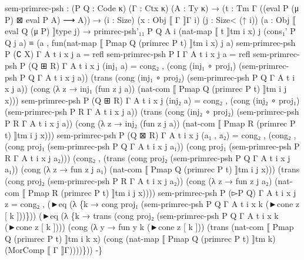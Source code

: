 \begin{code}
{sem{-}primrec{-}psh : (P Q : Code κ) (Γ : Ctx κ) (A : Ty κ)
  → (t : Tm Γ ((eval P (μ P) ⊠ eval P A) ⟶ A))
  → (i : Size) (x : Obj ⟦ Γ ⟧Γ i) (j : Size< (↑ i)) (a : Obj ⟦ eval Q (μ P) ⟧type j)
  → primrec{-}psh'₁₁ P Q A i (nat{-}map ⟦ t ⟧tm i x) j (cons₁' P Q j a) ≡ (a , fun(nat{-}map ⟦ Pmap Q (primrec P t) ⟧tm i x) j a)
sem{-}primrec{-}psh P (∁ X) Γ A t i x j a = refl
sem{-}primrec{-}psh P I Γ A t i x j a = refl
sem{-}primrec{-}psh P (Q ⊞ R) Γ A t i x j (inj₁ a) =
  cong₂ \AgdaUnderscore{},\AgdaUnderscore{} (cong (inj₁ ∘ proj₁) (sem{-}primrec{-}psh P Q Γ A t i x j a))
            (trans (cong (inj₁ ∘ proj₂) (sem{-}primrec{-}psh P Q Γ A t i x j a))
                   (cong (λ z → inj₁ (fun z j a)) (nat{-}com ⟦ Pmap Q (primrec P t) ⟧tm i j x)))
sem{-}primrec{-}psh P (Q ⊞ R) Γ A t i x j (inj₂ a) =
  cong₂ \AgdaUnderscore{},\AgdaUnderscore{} (cong (inj₂ ∘ proj₁) (sem{-}primrec{-}psh P R Γ A t i x j a))
            (trans (cong (inj₂ ∘ proj₂) (sem{-}primrec{-}psh P R Γ A t i x j a))
                   (cong (λ z → inj₂ (fun z j a)) (nat{-}com ⟦ Pmap R (primrec P t) ⟧tm i j x)))
sem{-}primrec{-}psh P (Q ⊠ R) Γ A t i x j (a₁ , a₂) =
  cong₂ \AgdaUnderscore{},\AgdaUnderscore{} (cong₂ \AgdaUnderscore{},\AgdaUnderscore{} (cong proj₁ (sem{-}primrec{-}psh P Q Γ A t i x j a₁))
                       (cong proj₁ (sem{-}primrec{-}psh P R Γ A t i x j a₂)))
            (cong₂ \AgdaUnderscore{},\AgdaUnderscore{} (trans (cong proj₂ (sem{-}primrec{-}psh P Q Γ A t i x j a₁))
                              (cong (λ z → fun z j a₁) (nat{-}com ⟦ Pmap Q (primrec P t) ⟧tm i j x)))
                       (trans (cong proj₂ (sem{-}primrec{-}psh P R Γ A t i x j a₂))
                              (cong (λ z → fun z j a₂) (nat{-}com ⟦ Pmap R (primrec P t) ⟧tm i j x))))
sem{-}primrec{-}psh P (▻P Q) Γ A t i x j z =
  cong₂ \AgdaUnderscore{},\AgdaUnderscore{}
        (►eq (λ \{k → cong proj₁ (sem{-}primrec{-}psh P Q Γ A t i x k (►cone z [ k ]))\}))
        (►eq (λ \{k → trans (cong proj₂ (sem{-}primrec{-}psh P Q Γ A t i x k (►cone z [ k ])))
                           (cong (λ y → fun y k (►cone z [ k ]))
                                 (trans (nat{-}com ⟦ Pmap Q (primrec P t) ⟧tm i k x)
                                        (cong (nat{-}map ⟦ Pmap Q (primrec P t) ⟧tm k) (MorComp ⟦ Γ ⟧Γ))))\}))
{-}\}}\<%
\\
%
\\[\AgdaEmptyExtraSkip]%
\>[0]\AgdaSpace{}%
\AgdaSymbol{:}\AgdaSpace{}%
\AgdaSymbol{(}\AgdaSpace{}%
\AgdaSpace{}%
\AgdaSymbol{:}\AgdaSpace{}%
\AgdaSpace{}%

\end{code}
